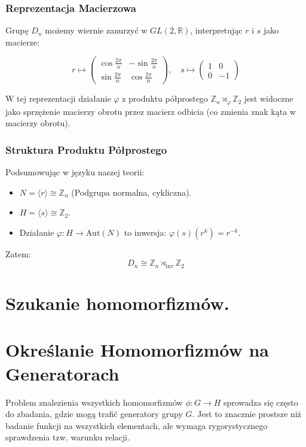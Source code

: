 \subsubsection{Reprezentacja Macierzowa}

Grupę $D_n$ możemy wiernie zanurzyć w $GL(2, \mathbb{R})$, interpretując $r$ i $s$ jako macierze:

\[ r \mapsto \begin{pmatrix} \cos \frac{2\pi}{n} & -\sin \frac{2\pi}{n} \\ \sin \frac{2\pi}{n} & \cos \frac{2\pi}{n} \end{pmatrix}, \quad 
   s \mapsto \begin{pmatrix} 1 & 0 \\ 0 & -1 \end{pmatrix} \]
   
W tej reprezentacji działanie $\varphi$ z produktu półprostego $\mathbb{Z}_n \rtimes_\varphi \mathbb{Z}_2$ jest widoczne jako sprzężenie macierzy obrotu przez macierz odbicia (co zmienia znak kąta w macierzy obrotu).

\subsubsection{Struktura Produktu Półprostego}

Podsumowując w języku naszej teorii:
\begin{itemize}
    \item $N = \langle r \rangle \cong \mathbb{Z}_n$ (Podgrupa normalna, cykliczna).
    \item $H = \langle s \rangle \cong \mathbb{Z}_2$.
    \item Działanie $\varphi: H \to \text{Aut}(N)$ to inwersja: $\varphi(s)(r^k) = r^{-k}$.
\end{itemize}
Zatem:
\[ D_n \cong \mathbb{Z}_n \rtimes_{\text{inv}} \mathbb{Z}_2 \]


\section{Szukanie homomorfizmów.}

\section{Określanie Homomorfizmów na Generatorach}

Problem znalezienia wszystkich homomorfizmów $\phi: G \to H$ sprowadza się często do zbadania, gdzie mogą trafić generatory grupy $G$. Jest to znacznie prostsze niż badanie funkcji na wszystkich elementach, ale wymaga rygorystycznego sprawdzenia tzw. warunku relacji.

